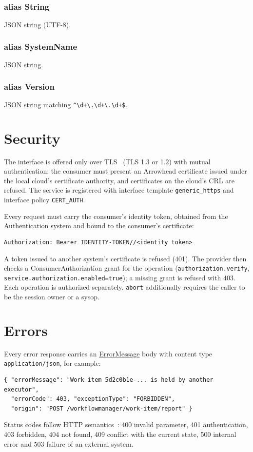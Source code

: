\documentclass[a4paper]{arrowhead}
\newcommand{\mref}[1]{{\textcolor{ArrowheadPurple}{\hyperref[sec:model:#1]{#1}}}}
\newcommand{\pdef}[1]{{\textcolor{ArrowheadGrey}{#1\label{sec:model:primitives:#1}\label{sec:model:primitives:#1s}}}}
\begin{document}
\subsubsection*{alias \pdef{String}}
JSON string (UTF-8).

\subsubsection*{alias \pdef{SystemName}}
JSON string.

\subsubsection*{alias \pdef{Version}}
JSON string matching \texttt{\^{}\textbackslash{}d+\textbackslash{}.\textbackslash{}d+\textbackslash{}.\textbackslash{}d+\$}.



\section{Security}
\label{sec:security}
The interface is offered only over TLS~\cite{rfc8446} (TLS 1.3 or 1.2) with mutual authentication: the consumer must
present an Arrowhead certificate issued under the local cloud's certificate authority, and certificates on the
cloud's CRL are refused. The service is registered with interface template \texttt{generic\_\allowbreak{}https} and interface
policy \texttt{CERT\_AUTH}.

Every request must carry the consumer's identity token, obtained from the Authentication system and bound to the
consumer's certificate:
\begin{lstlisting}
Authorization: Bearer IDENTITY-TOKEN//<identity token>
\end{lstlisting}
A token issued to another system's certificate is refused (401). The provider then checks a ConsumerAuthorization
grant for the operation (\texttt{authorization.\allowbreak{}verify}, \texttt{service.\allowbreak{}authorization.\allowbreak{}enabled=\allowbreak{}true}); a missing grant is
refused with 403. Each operation is authorized separately. \texttt{abort} additionally requires the caller to be the session owner or a sysop.


\section{Errors}
\label{sec:errors}
Every error response carries an \mref{ErrorMessage} body with content type \texttt{application/\allowbreak{}json}, for example:
\begin{lstlisting}
{ "errorMessage": "Work item 5d2c0b1e-... is held by another executor",
  "errorCode": 403, "exceptionType": "FORBIDDEN",
  "origin": "POST /workflowmanager/work-item/report" }
\end{lstlisting}
Status codes follow HTTP semantics~\cite{rfc9110}: 400 invalid parameter, 401 authentication, 403 forbidden, 404 not
found, 409 conflict with the current state, 500 internal error and 503 failure of an external system.
\end{document}
